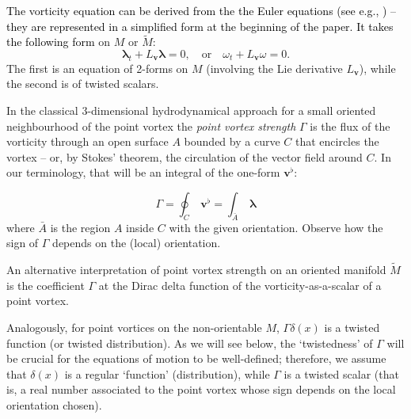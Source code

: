 \documentclass[11pt,twoside]{article}
\theoremstyle{definition}
\numberwithin{equation}{section}
\def\Mt{\widetilde{M}}
\def\blambda{{\boldsymbol\lambda}}
\begin{document}
\textcolor{black}{The vorticity equation can be derived from the the Euler equations (see e.g., \cite{acheson, falkovich})  -- they are represented in a simplified form at the beginning of the paper. It takes the following form} on $M$ or $\Mt$:
\begin{equation}
    \label{eq: scalar vorticity}
\blambda_t+L_{\mathbf{v}}\blambda=0,\quad\text{or}\quad \omega_t+L_{\mathbf{v}}\omega=0.\end{equation}
The first is an equation of 2-forms on $M$ (involving the Lie derivative $L_{\mathbf{v}}$), while the second is of twisted scalars. 

In the classical 3-dimensional  hydrodynamical  approach for a small oriented  neighbourhood of the point vortex the \emph{point vortex strength} $\Gamma$ is the flux of the vorticity through an open surface $A$ bounded by a curve  $C$ that encircles the vortex -- or, by Stokes' theorem, the circulation of the vector field around $C$.  In our terminology, that will be an integral of the one-form $\mathbf{v}^{\flat}$: 

\begin{equation}
\Gamma =  \oint_C  \ \mathbf{v}^{\flat} =\int_{\bar{A}} \ \blambda
\end{equation}
where $\bar{A}$ is the region $A$ inside $C$ with the given orientation. Observe how the sign of $\Gamma$ depends on the (local) orientation.  


An alternative interpretation of point vortex strength on an oriented manifold $\Mt$ is  the coefficient $\Gamma$ at the Dirac delta function of the vorticity-as-a-scalar of a point vortex.


Analogously, for point vortices on the non-orientable $M$, $\Gamma\delta(x)$ is a twisted function (or twisted distribution). As we will see below, the `twistedness' of $\Gamma$ will be crucial  for the equations of motion to be well-defined; therefore, we assume that $\delta(x)$ is a regular `function' (distribution), while $\Gamma$ is a twisted scalar (that is, a real number associated to the point vortex whose sign depends on the local orientation chosen). 
\end{document}
